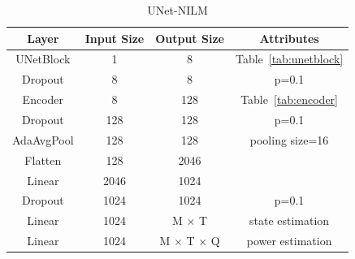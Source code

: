 \documentclass[sigconf]{acmart}
\begin{document}
\begin{table}
  \centering
  \caption{UNet-NILM}
  \begin{tabular}{c c c c}
    \hline\hline
    Layer & Input Size & Output Size & Attributes \\
    \hline
    UNetBlock & 1 & 8 & Table~\ref{tab:unetblock} \\
    Dropout & 8 & 8 & p=0.1 \\
    Encoder & 8 & 128 & Table~\ref{tab:encoder} \\
    Dropout & 128 & 128 & p=0.1 \\
    AdaAvgPool & 128 & 128 & pooling size=16 \\
    Flatten & 128 & 2046 &  \\
    Linear & 2046 & 1024 & \\
    Dropout & 1024 & 1024 & p=0.1 \\
    Linear & 1024 & M $\times$ T & state estimation\\
    Linear & 1024 & M $\times$ T $\times$ Q & power estimation\\
  \end{tabular}
  \label{tab:unetnilm}
\end{table}
\end{document}
